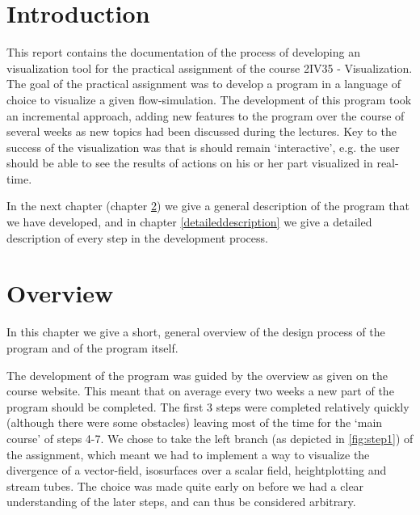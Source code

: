 \documentclass[a4paper,11pt,twoside]{report}
\begin{document}
\newcommand{\coursename}{Visualization (2IV35)}
\newcommand{\doctitle}{Practical assignment }
\newcommand{\docversion}{0.1}
\newcommand{\docdate}{\today}

\newcommand{\imagescalefactor}{0.40}
\newcommand{\cref}[1]{chapter \ref{#1}}
\newcommand{\TODO}[1]{\textsc{\textbf{TODO: #1}}}

\dotsspreamble

\tableofcontents

\dotssdocument

\chapter{Introduction}
	This report contains the documentation of the process of developing an visualization tool for the practical assignment of the course 2IV35 - Visualization. The goal of the practical assignment was to develop a program in a language of choice to visualize a given flow-simulation. The development of this program took an incremental approach, adding new features to the program over the course of several weeks as new topics had been discussed during the lectures. Key to the success of the visualization was that is should remain `interactive', e.g. the user should be able to see the results of actions on his or her part visualized in real-time.

	In the next chapter (\cref{overview}) we give a general description of the program that we have developed, and in \cref{detaileddescription} we give a detailed description of every step in the development process.

\chapter{Overview}\label{overview}
	In this chapter we give a short, general overview of the design process of the program and of the program itself.

	The development of the program was guided by the overview as given on the course website. This meant that on average every two weeks a new part of the program should be completed. The first 3 steps were completed relatively quickly (although there were some obstacles) leaving most of the time for the `main course' of steps 4-7. We chose to take the left branch (as depicted in \ref{fig:step1}) of the assignment, which meant we had to implement a way to visualize the divergence of a vector-field, isosurfaces over a scalar field, heightplotting and stream tubes. The choice was made quite early on before we had a clear understanding of the later steps, and can thus be considered arbitrary.
\end{document}

